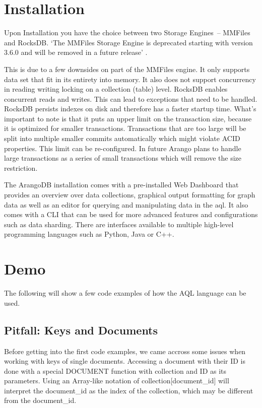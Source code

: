 \section{Installation}

Upon Installation you have the choice between two Storage Engines – MMFiles and RocksDB. `The MMFiles Storage Engine is deprecated starting with version 3.6.0 and will be removed in a future release' \parencite{ArangoDeprecated}.

This is due to a few downsides on part of the MMFiles engine. It only supports data set that fit in its entirety into memory. It also does not support concurrency in reading writing locking on a collection (table) level. RocksDB enables concurrent reads and writes. This can lead to exceptions that need to be handled. RocksDB persists indexes on disk and therefore has a faster startup time. What's important to note is that it puts an upper limit on the transaction size, because it is optimized for smaller transactions. Transactions that are too large will be split into multiple smaller commits automatically which might violate ACID properties. This limit can be re-configured. In future Arango plans to handle large transactions as a series of small transactions which will remove the size restriction. \parencite{MMvsRocks}

The ArangoDB installation comes with a pre-installed Web Dashboard that provides an overview over data collections, graphical output formatting for graph data as well as an editor for querying and manipulating data in the \gls{aql}. It also comes with a CLI that can be used for more advanced features and configurations such as data sharding. There are interfaces available to multiple high-level programming languages such as Python, Java or C++. 

\section{Demo}
The following will show a few code examples of how the AQL language can be used.

\subsection{Pitfall: Keys and Documents}
Before getting into the first code examples, we came accross some issues when working with keys of single documents. Accessing a document with their ID is done with a special DOCUMENT function with collection and ID as its parameters. Using an Array-like notation of collection[document\_id] will interpret the document\_id as the index of the collection, which may be different from the document\_id.


